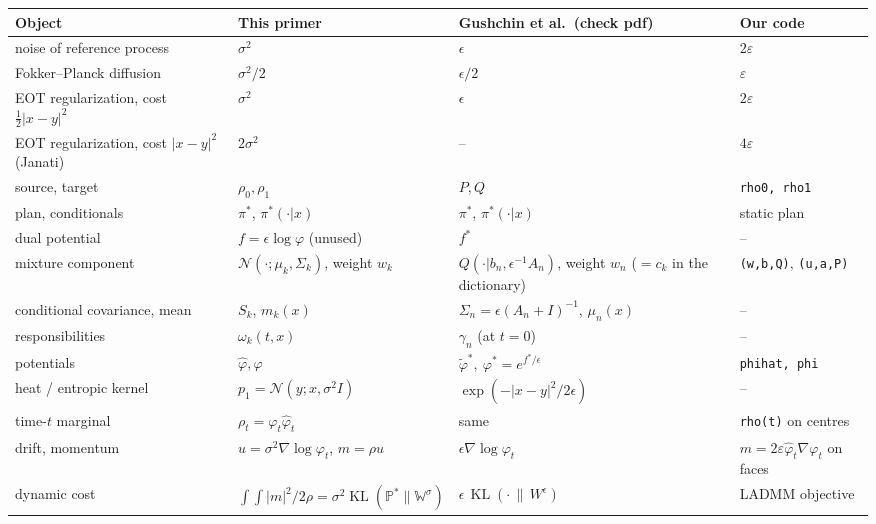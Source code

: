 \documentclass[11pt]{article}
\newcommand{\eps}{\varepsilon}
\newcommand{\code}[1]{\texttt{#1}}
\newcommand{\KL}{\operatorname{KL}}
\newcommand{\Nc}{\mathcal{N}}
\newcommand{\hphi}{\hat\varphi}
\theoremstyle{definition}
\theoremstyle{plain}
\begin{document}
\begin{center}
\small
\begin{tabular}{@{}p{3.9cm}p{3.1cm}p{3.0cm}p{3.6cm}@{}}
\toprule
Object & This primer & Gushchin et al.\ (check pdf) & Our code \\
\midrule
noise of reference process & $\sigma^2$ & $\epsilon$ & $2\eps$ \\
Fokker--Planck diffusion & $\sigma^2/2$ & $\epsilon/2$ & $\eps$ \\
EOT regularization, cost $\tfrac12|x-y|^2$ & $\sigma^2$ & $\epsilon$ & $2\eps$ \\
EOT regularization, cost $|x-y|^2$ (Janati) & $2\sigma^2$ & -- & $4\eps$ \\
source, target & $\rho_0,\rho_1$ & $P,Q$ & \code{rho0, rho1} \\
plan, conditionals & $\pi^*$, $\pi^*(\cdot|x)$ & $\pi^*$, $\pi^*(\cdot|x)$ & static plan \\
dual potential & $f=\epsilon\log\varphi$ (unused) & $f^*$ & -- \\
mixture component & $\Nc(\cdot;\mu_k,\Sigma_k)$, weight $w_k$ & $Q(\cdot|b_n,\epsilon^{-1}A_n)$, weight $w_n$ ($=c_k$ in the dictionary) & \code{(w,b,Q)}, \code{(u,a,P)} \\
conditional covariance, mean & $S_k$, $m_k(x)$ & $\Sigma_n=\epsilon(A_n+I)^{-1}$, $\mu_n(x)$ & -- \\
responsibilities & $\omega_k(t,x)$ & $\gamma_n$ (at $t=0$) & -- \\
potentials & $\hphi,\varphi$ & $\tilde\varphi^*,\ \varphi^*=e^{f^*/\epsilon}$ & \code{phihat, phi} \\
heat / entropic kernel & $p_1=\Nc(y;x,\sigma^2I)$ & $\exp(-|x-y|^2/2\epsilon)$ & -- \\
time-$t$ marginal & $\rho_t=\varphi_t\hphi_t$ & same & \code{rho(t)} on centres \\
drift, momentum & $u=\sigma^2\nabla\log\varphi_t$, $m=\rho u$ & $\epsilon\nabla\log\varphi_t$ & $m=2\eps\hphi_t\nabla\varphi_t$ on faces \\
dynamic cost & $\int\!\!\int|m|^2/2\rho=\sigma^2\KL(\mathbb{P}^*\|\mathbb{W}^\sigma)$ & $\epsilon\,\KL(\cdot\,\|\,W^\epsilon)$ & LADMM objective \\
\bottomrule
\end{tabular}
\end{center}
\end{document}
